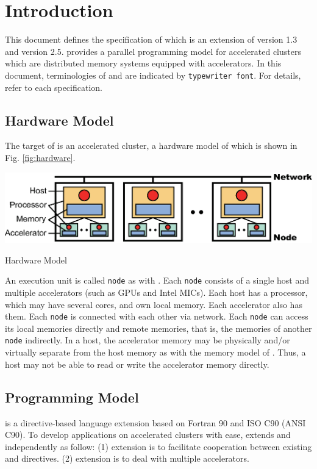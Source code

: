 \chapter{Introduction}\label{chap:intro}
\setcounter{page}{1}
This document defines the specification of {\XACC} which is an extension of {\XMP} version 1.3\cite{xmp} and {\OACC} version 2.5\cite{openacc}.
{\XACC} provides a parallel programming model for accelerated clusters
which are distributed memory systems equipped with accelerators.
In this document,
terminologies of {\XMP} and {\OACC} are indicated by {\tt typewriter font}.
For details, refer to each specification\cite{xmp,openacc}.

\section{Hardware Model}
The target of {\XACC} is an accelerated cluster,
a hardware model of which is shown in Fig. \ref{fig:hardware}.

\begin{myfigure}
  \includegraphics[scale=0.9,clip]{figs/hardware.eps}
  \caption{Hardware Model}\label{fig:hardware}
\end{myfigure}

An execution unit is called {\tt node} as with {\XMP}.
Each {\tt node} consists of a single host and multiple accelerators (such as GPUs and Intel MICs).
Each host has a processor, which may have several cores, and own local memory.
Each accelerator also has them.
Each {\tt node} is connected with each other via network.
Each {\tt node} can access its local memories directly and remote memories,
that is, the memories of another {\tt node} indirectly.
In a host,
the accelerator memory may be physically and/or virtually separate from the host memory as with the memory model of {\OACC}.
Thus,
a host may not be able to read or write the accelerator memory directly.

\section{Programming Model}
{\XACC} is a directive-based language extension based on Fortran 90 and ISO C90 (ANSI C90).
To develop applications on accelerated clusters with ease,
{\XACC} extends {\XMP} and {\OACC} independently as follow:
(1) {\XMP} extension is to facilitate cooperation between existing {\XMP} and {\OACC} directives.
(2) {\OACC} extension is to deal with multiple accelerators.

